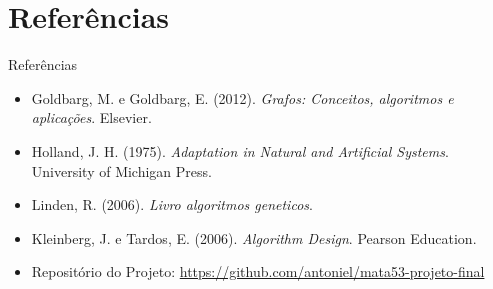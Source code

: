 \documentclass[aspectratio=169,xcolor=table]{beamer}
\begin{document}
\section{Referências}
\begin{frame}{Referências}
    \begin{itemize}
        \item Goldbarg, M. e Goldbarg, E. (2012). \emph{Grafos: Conceitos, algoritmos e aplicações}. Elsevier.
        \item Holland, J. H. (1975). \emph{Adaptation in Natural and Artificial Systems}. University of Michigan Press.
        \item Linden, R. (2006). \emph{Livro algoritmos geneticos}.
        \item Kleinberg, J. e Tardos, E. (2006). \emph{Algorithm Design}. Pearson Education.
        \item Repositório do Projeto: \url{https://github.com/antoniel/mata53-projeto-final}
    \end{itemize}
\end{frame}
\end{document}
